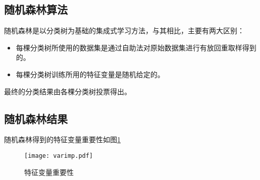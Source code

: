 \subsection{随机森林算法}
随机森林是以分类树为基础的集成式学习方法，与其相比，主要有两大区别：
\begin{itemize}
	\item 每棵分类树所使用的数据集是通过自助法对原始数据集进行有放回重取样得到的。
	\item 每棵分类树训练所用的特征变量是随机给定的。
\end{itemize}
最终的分类结果由各棵分类树投票得出。

\subsection{随机森林结果}
随机森林得到的特征变量重要性如图\ref{fig:varimp}
\begin{figure}
\centering
\texttt{[image: varimp.pdf]}
\caption{\label{fig:varimp}特征变量重要性}
\end{figure}






